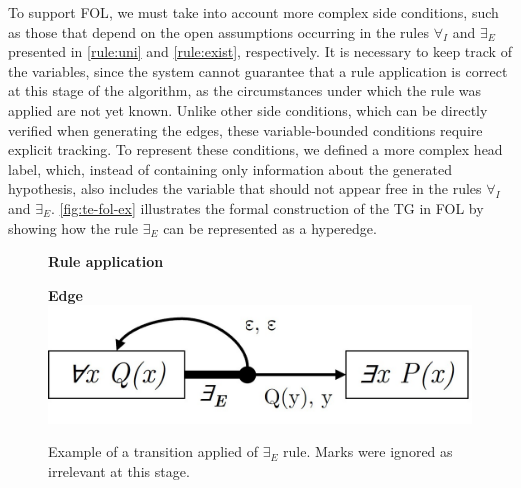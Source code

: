 To support \gls{FOL}, we must take into account more complex side conditions, such as those that depend on the open assumptions occurring in the rules \(\forall_I\) and \(\exists_E\) presented in \autoref{rule:uni} and \autoref{rule:exist}, respectively. It is necessary to keep track of the variables, since the system cannot guarantee that a rule application is correct at this stage of the algorithm, as the circumstances under which the rule was applied are not yet known. Unlike other side conditions, which can be directly verified when generating the edges, these variable-bounded conditions require explicit tracking. To represent these conditions, we defined a more complex head label, which, instead of containing only information about the generated hypothesis, also includes the variable that should not appear free in the rules \(\forall_I\) and \(\exists_E\). \autoref{fig:te-fol-ex} illustrates the formal construction of the \gls{TG} in \gls{FOL} by showing how the rule \(\exists_E\) can be represented as a hyperedge.

\begin{figure}[h!]
\centering
\begin{minipage}{0.45\textwidth}
    \centering
    \textbf{Rule application} \\[0.5em]
    \begin{prooftree}
    \end{prooftree}
\end{minipage}
\hfill
\begin{minipage}{0.45\textwidth}
    \centering
    \textbf{Edge} \\[0.5em]
    \includegraphics[width=\linewidth]{Chapters/Figures/te-fol-example.jpg}
\end{minipage}
        \caption{Example of a transition applied of \(\exists_E\) rule. Marks were ignored as irrelevant at this stage.}
\label{fig:te-fol-ex}
\end{figure}

